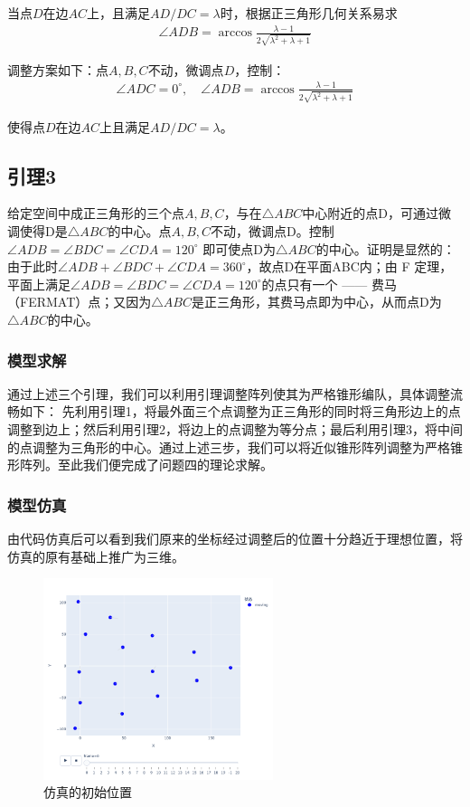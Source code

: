 \documentclass[withoutpreface,bwprint]{cumcmthesis} %
\begin{document}
当点\( D \)在边\( AC \)上，且满足\( AD/DC = \lambda \)时，根据正三角形几何关系易求
\begin{align}
    \angle ADB = \arccos \frac{\lambda - 1}{2\sqrt{\lambda^2 + \lambda + 1}}
\end{align}


调整方案如下：点\( A,B,C \)不动，微调点\( D \)，控制：
\begin{align}
    \angle ADC = 0^\circ, \quad \angle ADB = \arccos \frac{\lambda - 1}{2\sqrt{\lambda^2 + \lambda + 1}}
\end{align}

使得点\( D \)在边\( AC \)上且满足\( AD/DC = \lambda \)。
\subsection*{引理3} 
给定空间中成正三角形的三个点\(A,B,C\)，与在\(\triangle ABC\)中心附近的点D，可通过微调使得D是\(\triangle ABC\)的中心。点\(A,B,C\)不动，微调点D。控制
\(\angle ADB = \angle BDC = \angle CDA = 120^\circ\)
即可使点D为\(\triangle ABC\)的中心。证明是显然的：由于此时\(\angle ADB + \angle BDC + \angle CDA = 360^\circ\)，故点D在平面ABC内；由 F 定理，平面上满足\(\angle ADB = \angle BDC = \angle CDA = 120^\circ\)的点只有一个 —— 费马（FERMAT）点；又因为\(\triangle ABC\)是正三角形，其费马点即为中心，从而点D为\(\triangle ABC\)的中心。

\subsubsection{模型求解}
通过上述三个引理，我们可以利用引理调整阵列使其为严格锥形编队，具体调整流畅如下：
先利用引理1，将最外面三个点调整为正三角形的同时将三角形边上的点调整到边上；然后利用引理2，将边上的点调整为等分点；最后利用引理3，将中间的点调整为三角形的中心。通过上述三步，我们可以将近似锥形阵列调整为严格锥形阵列。至此我们便完成了问题四的理论求解。
\subsubsection{模型仿真}

由代码仿真后可以看到我们原来的坐标经过调整后的位置十分趋近于理想位置，将仿真的原有基础上推广为三维。
\begin{figure}[H]
    \centering
    \includegraphics[width=0.6\textwidth]{../../figure/start_4.png} 
    \caption{仿真的初始位置}
    \label{q4_2}    
\end{figure}
\end{document}
